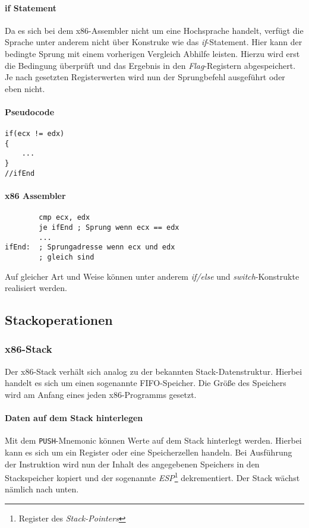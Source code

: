 \paragraph{if Statement}

Da es sich bei dem x86-Assembler nicht um eine Hochsprache handelt, verfügt die Sprache unter anderem nicht über Konstruke wie das \textit{if}-Statement.
Hier kann der bedingte Sprung mit einem vorherigen Vergleich Abhilfe leisten.
Hierzu wird erst die Bedingung überprüft und das Ergebnis in den \textit{Flag}-Registern abgespeichert.
Je nach gesetzten Registerwerten wird nun der Sprungbefehl ausgeführt oder eben nicht.

\paragraph{Pseudocode\newline}\makebox{}
\begin{lstlisting}
if(ecx != edx)
{
	...
}
//ifEnd
\end{lstlisting}

\paragraph{x86 Assembler\newline}\makebox{}
\begin{lstlisting}
        cmp ecx, edx
        je ifEnd ; Sprung wenn ecx == edx
        ...
ifEnd:  ; Sprungadresse wenn ecx und edx
        ; gleich sind 
\end{lstlisting}

Auf gleicher Art und Weise können unter anderem \textit{if/else} und \textit{switch}-Konstrukte realisiert werden.


\subsection{Stackoperationen}
\subsubsection{x86-Stack}
Der x86-Stack verhält sich analog zu der bekannten Stack-Datenstruktur. Hierbei handelt es sich um einen sogenannte FIFO-Speicher.
Die Größe des Speichers wird am Anfang eines jeden x86-Programms gesetzt.

\paragraph{Daten auf dem Stack hinterlegen\newline} 
Mit dem \texttt{PUSH}-Mnemonic können Werte auf dem Stack hinterlegt werden.
Hierbei kann es sich um ein Register oder eine Speicherzellen handeln.
Bei Ausführung der Instruktion wird nun der Inhalt des angegebenen Speichers in den Stackspeicher kopiert
und der sogenannte \textit{ESP}\footnote{Register des \textit{Stack-Pointers}} dekrementiert.
Der Stack wächst nämlich nach unten.

